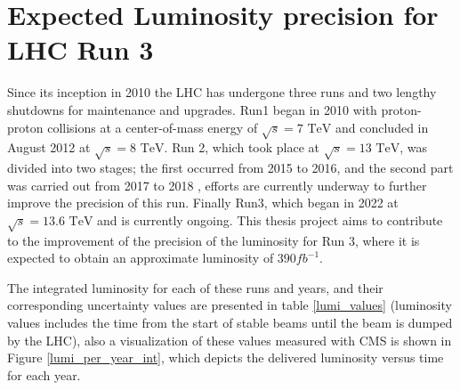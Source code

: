\section{Expected  Luminosity precision for LHC Run 3}


Since its inception in 2010 the LHC has undergone three runs and two lengthy shutdowns for maintenance and upgrades. 
Run1 began in 2010 with proton-proton collisions at a center-of-mass energy of $\sqrt{s}=\text{7 TeV}$ and concluded in August 2012 at  $\sqrt{s}=\text{8 TeV}$\cite{LHC_status_2013}. Run 2, which took place at $\sqrt{s}=\text{13 TeV}$, was divided into two stages; the first  occurred from 2015 to 2016, and the second part  was carried out   from 2017 to 2018 \cite{pas_17,pas_18}, efforts are currently underway to further improve the precision of this run. Finally  Run3, which began in 2022 at $\sqrt{s}=\text{13.6 TeV}$ and is currently ongoing. This thesis project aims to contribute to the improvement of the precision of the luminosity for Run 3, where it is expected to obtain an approximate luminosity of $390 fb^{-1}$. 

The integrated luminosity for each of these runs and years, and their corresponding uncertainty values are presented in table \ref{lumi_values} (luminosity values includes the time from the start of stable beams until the beam is dumped by the LHC), also a visualization of these values measured with CMS is shown in Figure \ref{lumi_per_year_int}, which depicts the delivered luminosity versus time for each year.


